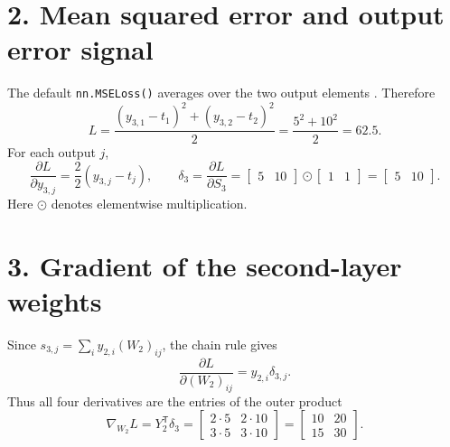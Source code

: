 \documentclass[11pt]{article}
\begin{document}
\section*{2. Mean squared error and output error signal}
The default \texttt{nn.MSELoss()} averages over the two output elements
\cite{mse}. Therefore
\[
L=\frac{(y_{3,1}-t_1)^2+(y_{3,2}-t_2)^2}{2}
 =\frac{5^2+10^2}{2}=62.5.
\]
For each output $j$,
\[
\frac{\partial L}{\partial y_{3,j}}
 =\frac{2}{2}(y_{3,j}-t_j),\qquad
\delta_3=\frac{\partial L}{\partial S_3}
 =\begin{bmatrix}5&10\end{bmatrix}\odot\begin{bmatrix}1&1\end{bmatrix}
 =\begin{bmatrix}5&10\end{bmatrix}.
\]
Here $\odot$ denotes elementwise multiplication.

\section*{3. Gradient of the second-layer weights}
Since $s_{3,j}=\sum_i y_{2,i}(W_2)_{ij}$, the chain rule gives
\[
\frac{\partial L}{\partial(W_2)_{ij}}=y_{2,i}\delta_{3,j}.
\]
Thus all four derivatives are the entries of the outer product
\[
\boxed{\nabla_{W_2}L=Y_2^{\mathsf T}\delta_3
 =\begin{bmatrix}2\cdot5&2\cdot10\\3\cdot5&3\cdot10\end{bmatrix}
 =\begin{bmatrix}10&20\\15&30\end{bmatrix}.}
\]

\newpage
\end{document}
